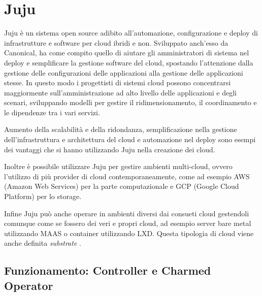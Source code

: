 \section{Juju}\label{subsec:juju}
Juju \cite{juju_home} è un sistema open source adibito all'automazione, configurazione e deploy di infrastrutture e software per cloud ibridi e non.
% 
Sviluppato anch'esso da Canonical, ha come compito quello di aiutare gli amministratori di sistema nel deploy e semplificare la gestione software del cloud, spostando l'attenzione dalla gestione delle configurazioni delle applicazioni alla gestione delle applicazioni stesse.
% 
In questo modo i progettisti di sistemi cloud possono concentrarsi maggiormente sull'amministrazione ad alto livello delle applicazioni e degli scenari, sviluppando modelli per gestire il ridimensionamento, il coordinamento  e le dipendenze tra i vari servizi.

Aumento della scalabilità e della ridondanza, semplificazione nella gestione dell'infrastruttura e architettura del cloud e automazione nel deploy sono esempi dei vantaggi che si hanno utilizzando Juju nella creazione dei cloud.

Inoltre è possibile utilizzare Juju per gestire ambienti multi-cloud, ovvero l'utilizzo di più provider di cloud contemporaneamente, come ad esempio AWS (Amazon Web Services) per la parte computazionale e GCP (Google Cloud Platform) per lo storage.

Infine Juju può anche operare in ambienti diversi dai consueti cloud gestendoli comunque come se fossero dei veri e propri cloud, 
ad esempio server bare metal utilizzando MAAS o container utilizzando LXD.
% 
Questa tipologia di cloud viene anche definita \emph{substrate} \cite{juju_cloud_substrate}.



\subsection{Funzionamento: Controller e Charmed Operator}\label{subsec:juju_funzionamento}
